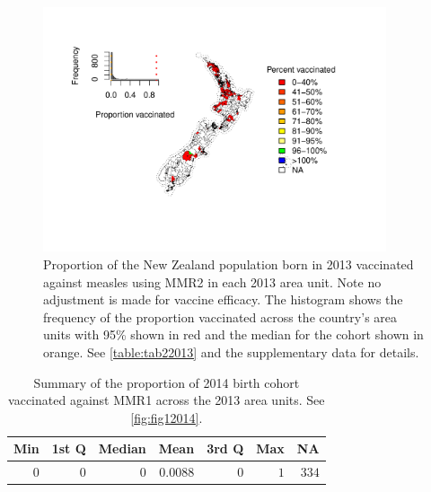 \documentclass{article}
\begin{document}
\begin{figure}
\begin{center}
    \includegraphics[width=0.9\textwidth]{nir_census_MMR2_NIR_2013.pdf}
\end{center}
\caption{Proportion of the New Zealand population born in 2013 vaccinated against measles using MMR2 in each 2013 area unit. Note no adjustment is made for vaccine efficacy. The histogram shows the frequency of the proportion vaccinated across the country's area units with 95\% shown in red and the median for the cohort shown in orange. See \autoref{table:tab22013} and the supplementary data for details.}
\label{fig:fig22013}
\end{figure}

 \vspace{5mm} %
\begin{table}
\begin{center}
\begin{tabular}{rrrrrrr}
\hline\hline
\multicolumn{1}{c}{Min}&\multicolumn{1}{c}{1st Q}&\multicolumn{1}{c}{Median}&\multicolumn{1}{c}{Mean}&\multicolumn{1}{c}{3rd Q}&\multicolumn{1}{c}{Max}&\multicolumn{1}{c}{NA}\tabularnewline
\hline
$0$&$0$&$0$&$0.0088$&$0$&$1$&$334$\tabularnewline
\hline
\end{tabular}\end{center}\caption{Summary of the proportion of 2014 birth cohort vaccinated against MMR1 across the 2013 area units. See \autoref{fig:fig12014}.}
\label{table:tab12014}
\end{table}
\end{document}
